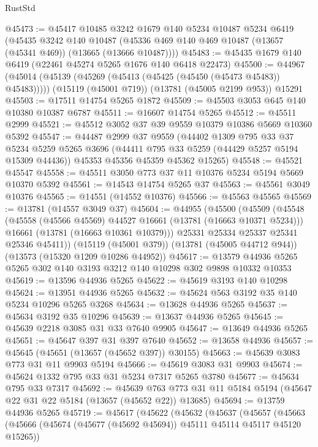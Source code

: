 \begin{lexlean}{RustStd}
\begin{coremodule}
@45473 := @45417
    @10485
    @3242
    @1679
    @140
    @5234
    @10487
    @5234
    @6419
    (@45435
      @3242
      @140
      @10487
      (@45336 @469 @140 @469 @10487 (@13657 (@45341 @469)) (@13665 (@13666 @10487))))
@45483 := @45435 @1679 @140 @6419 (@22461 @45274 @5265 @1676 @140 @6418 @22473)
@45500 := @44967
    (@45014 (@45139 (@45269 (@45413 (@45425 (@45450 (@45473 @45483)) @45483)))))
    (@15119 (@45001 @719))
    (@13781 (@45005 @2199 @953))
    @15291
@45503 := @17511 @14754 @5265 @1872
@45509 := @45503 @3053 @645 @140 @10380 @10387 @6787
@45511 := @16607 @14754 @5265
@45512 := @45511 @2999
@45521 := @45512 @3052 @37 @39 @9559 @10379 @10386 @5669 @10360 @5392
@45547 := @44487
    @2999
    @37
    @9559
    (@44402
      @1309
      @795
      @33
      @37
      @5234
      @5259
      @5265
      @3696
      (@44411 @795 @33 @5259 (@44429 @5257 @5194 @15309 @44436))
      @45353
      @45356
      @45359
      @45362
      @15265)
@45548 := @45521 @45547
@45558 := @45511 @3050 @773 @37 @11 @10376 @5234 @5194 @5669 @10370 @5392
@45561 := @14543 @14754 @5265 @37
@45563 := @45561 @3049 @10376
@45565 := @14551 (@14552 @10376)
@45566 := @45563 @45565
@45569 := @13781 (@14557 @3049 @37)
@45604 := @44955
    (@45500
      (@45509
        (@45548
          (@45558 (@45566 @45569) @44527 @16661 (@13781 (@16663 @10371 @5234)))
          @16661
          (@13781 (@16663 @10361 @10379)))
        @25331
        @25334
        @25337
        @25341
        @25346
        @45411))
    (@15119 (@45001 @379))
    (@13781 (@45005 @44712 @944))
    (@13573 (@15320 @1209 @10286 @44952))
@45617 := @13579 @44936 @5265 @5265 @302 @140 @3193 @3212 @140 @10298 @302 @9898 @10332 @10353
@45619 := @13596 @44936 @5265
@45622 := @45619 @3193 @140 @10298
@45624 := @13951 @44936 @5265
@45632 := @45624 @563 @3192 @35 @140 @5234 @10296 @5265 @3268
@45634 := @13628 @44936 @5265
@45637 := @45634 @3192 @35 @10296
@45639 := @13637 @44936 @5265
@45645 := @45639 @2218 @3085 @31 @33 @7640 @9905
@45647 := @13649 @44936 @5265
@45651 := @45647 @397 @31 @397 @7640
@45652 := @13658 @44936
@45657 := @45645 (@45651 (@13657 (@45652 @397)) @30155)
@45663 := @45639 @3083 @773 @31 @11 @9903 @5194
@45666 := @45619 @3083 @31 @9903
@45674 := @45624 @1332 @795 @33 @31 @5234 @7317 @5265 @3780
@45677 := @45634 @795 @33 @7317
@45692 := @45639
    @763
    @773
    @31
    @11
    @5184
    @5194
    (@45647 @22 @31 @22 @5184 (@13657 (@45652 @22)) @13685)
@45694 := @13759 @44936 @5265
@45719 := @45617
    (@45622
      (@45632
        (@45637
          (@45657
            (@45663
              (@45666 (@45674 (@45677 (@45692 @45694)) @45111 @45114 @45117 @45120 @15265))

\end{coremodule}
\end{lexlean}
